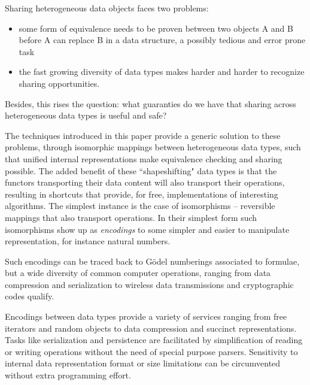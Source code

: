 \documentclass[]{INCLUDES/llncs}
\begin{document}
Sharing heterogeneous data objects faces two problems:
\begin{itemize}
\item some form of equivalence needs to be proven between two objects A and B before A can 
replace B in a data structure, a possibly tedious and error prone task

\item the fast growing diversity of data types makes harder and harder to
recognize sharing opportunities.
\end{itemize}

Besides, this rises the question: what
guaranties do we have that sharing across heterogeneous
data types is useful and safe?

The techniques introduced in this paper provide a generic solution to these
problems, through isomorphic mappings between heterogeneous data types, 
such that unified internal representations 
make equivalence checking and sharing possible. 
The added benefit of these ``shapeshifting" 
data types is that the functors transporting their data content will also transport their 
operations, resulting in  shortcuts that provide, for free, implementations of 
interesting algorithms. The simplest instance is the case of
isomorphisms -- reversible mappings that also transport operations.
In their simplest form such isomorphisms show up as {\em encodings}
to some simpler and easier to manipulate representation, for
instance natural numbers. 

Such encodings can be traced back to G\"{o}del
numberings \cite{Goedel:31,conf/icalp/HartmanisB74} associated to formulae,
but a wide diversity of common computer operations, ranging
from data compression and serialization to
wireless data transmissions and cryptographic codes qualify.
 
Encodings between data types provide a variety of services ranging from
free iterators and random objects to data compression and succinct
representations. Tasks like serialization and persistence are facilitated
by simplification of reading or writing operations without the need of
special purpose parsers. Sensitivity to internal data representation
format or size limitations can be circumvented without extra programming
effort.

\begin{comment}
Kolmogorov-Chaitin algorithmic complexity is based on the existence of
various equivalent representations of data objects, and in particular
(minimal) programs that produce them in a given language and encoding
\cite{vitanyi,Chaitin75atheory,Calude94algorithmicallycoding}.

In the context of algorithmic information theory, one can
interpret data structures like graphs and program constructs
like loops or recursion as compression mechanisms focusing
on sharing and reuse of equivalent blocks of information.
In this case, maximal sharing acts as the dual of minimal
program+input size. 
With this in mind, shapeshifting through a uniform set of encodings 
would extend sharing opportunities across 
heterogeneous data and code types.
\end{comment}
\end{document}
